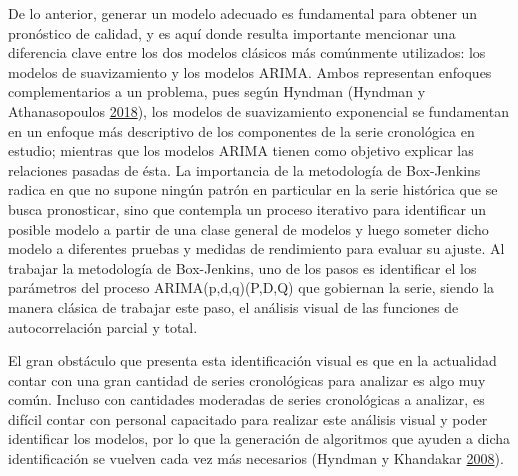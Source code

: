 \documentclass[12pt]{article}
\begin{document}
De lo anterior, generar un modelo adecuado es fundamental para obtener
un pronóstico de calidad, y es aquí donde resulta importante mencionar
una diferencia clave entre los dos modelos clásicos más comúnmente
utilizados: los modelos de suavizamiento y los modelos ARIMA. Ambos
representan enfoques complementarios a un problema, pues según Hyndman
(Hyndman y Athanasopoulos
\protect\hyperlink{ref-hyndman2018forecasting}{2018}), los modelos de
suavizamiento exponencial se fundamentan en un enfoque más descriptivo
de los componentes de la serie cronológica en estudio; mientras que los
modelos ARIMA tienen como objetivo explicar las relaciones pasadas de
ésta. La importancia de la metodología de Box-Jenkins radica en que no
supone ningún patrón en particular en la serie histórica que se busca
pronosticar, sino que contempla un proceso iterativo para identificar un
posible modelo a partir de una clase general de modelos y luego someter
dicho modelo a diferentes pruebas y medidas de rendimiento para evaluar
su ajuste. Al trabajar la metodología de Box-Jenkins, uno de los pasos
es identificar el los parámetros del proceso ARIMA(p,d,q)(P,D,Q) que
gobiernan la serie, siendo la manera clásica de trabajar este paso, el
análisis visual de las funciones de autocorrelación parcial y total.

El gran obstáculo que presenta esta identificación visual es que en la
actualidad contar con una gran cantidad de series cronológicas para
analizar es algo muy común. Incluso con cantidades moderadas de series
cronológicas a analizar, es difícil contar con personal capacitado para
realizar este análisis visual y poder identificar los modelos, por lo
que la generación de algoritmos que ayuden a dicha identificación se
vuelven cada vez más necesarios (Hyndman y Khandakar
\protect\hyperlink{ref-auto.arima}{2008}).
\end{document}
